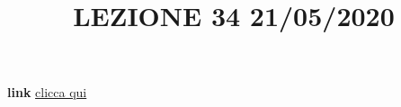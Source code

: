 \newline
\newline
\title{LEZIONE 34 21/05/2020}\newline
\textbf{link} \href{https://web.microsoftstream.com/video/0631b358-409e-4630-8d38-6a34fe278857?list=user&userId=faa91214-a6f5-40d7-8875-253fd49b8ce1}{clicca qui}
